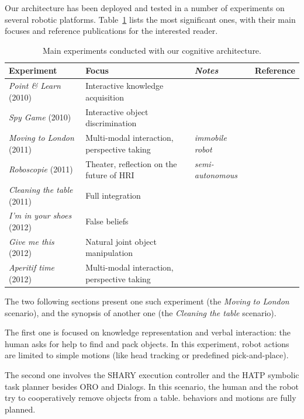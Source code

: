 \documentclass[preprint,3p,times]{elsarticle}
\begin{document}
Our architecture has been deployed and tested in a number of experiments on
several robotic platforms. Table~\ref{table|experiences} lists the most
significant ones, with their main focuses and reference publications for the
interested reader.

\begin{table}
\begin{center}

\begin{tabular}{llll}
 \bf{Experiment} & Focus & \emph{Notes} & Reference \\
\hline
{\it Point \& Learn} (2010) & Interactive knowledge acquisition & & \cite{Lemaignan2010} \\
{\it Spy Game} (2010) & Interactive object discrimination & & \cite{Ros2010b} \\
{\it Moving to London} (2011) & Multi-modal interaction, perspective taking & \emph{immobile robot} & \cite{lemaignan2011what} \\
{\it Roboscopie} (2011) & Theater, reflection on the future of HRI & \emph{semi-autonomous} & \cite{lemaignan2012roboscopie} \\
{\it Cleaning the table} (2011) & Full integration & & \cite{Alami2011} \\
{\it I'm in your shoes} (2012) & False beliefs & & \cite{warnier2012when} \\
{\it Give me this} (2012) & Natural joint object manipulation & & \cite{gharbi2013natural} \\
{\it Aperitif time} (2012) & Multi-modal interaction, perspective taking & & \cite{lemaignan2013talking} \\
\hline

\end{tabular}
\end{center}
\caption{Main experiments conducted with our cognitive architecture.}
\label{table|experiences}
\end{table}

The two following sections present one such experiment (the {\it Moving to
London} scenario), and the synopsis of another one (the {\it Cleaning the
table} scenario).

The first one is focused on knowledge representation and verbal interaction:
the human asks for help to find and pack objects. In this experiment, robot
actions are limited to simple motions (like head tracking or predefined
pick-and-place).

The second one involves the SHARY execution controller and the HATP symbolic
task planner besides ORO and {\sc Dialogs}. In this scenario, the human and the
robot try to cooperatively remove objects from a table. behaviors and motions
are fully planned.
\end{document}
